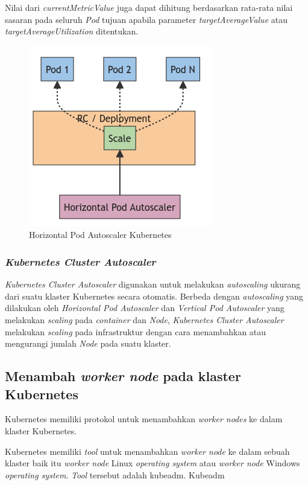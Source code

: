 Nilai dari \emph{currentMetricValue} juga dapat dihitung berdasarkan rata-rata nilai
sasaran pada seluruh \emph{Pod} tujuan apabila parameter \emph{targetAverageValue} atau
\emph{targetAverageUtilization} ditentukan.

\begin{figure} [H] \centering
  \includegraphics[scale=0.6]{gambar/horizontal_pod_autoscalling_figure.png}
  \caption{Horizontal Pod Autoscaler Kubernetes \parencite{kubernetes-website-hpa}}
  \label{fig:HorizontalPodAutoscalling}
\end{figure}

\subsubsection{\emph{Kubernetes Cluster Autoscaler}}

\emph{Kubernetes Cluster Autoscaler} digunakan untuk melakukan \emph{autoscaling}
ukurang dari suatu klaster Kubernetes secara otomatis. Berbeda dengan \emph{autoscaling}
yang dilakukan oleh \emph{Horizontal Pod Autoscaler} dan \emph{Vertical Pod Autoscaler} yang
melakukan \emph{scaling} pada \emph{container} dan \emph{Node}, \emph{Kubernetes Cluster Autoscaler}
melakukan \emph{scaling} pada infrastruktur dengan cara menambahkan atau mengurangi jumlah
\emph{Node} pada suatu klaster.

\subsection{Menambah \emph{worker node} pada klaster Kubernetes}

Kubernetes memiliki protokol untuk menambahkan \emph{worker nodes} ke dalam klaster Kubernetes.

Kubernetes memiliki \emph{tool} untuk menambahkan \emph{worker node} ke dalam sebuah klaster
baik itu \emph{worker node} Linux \emph{operating system} atau \emph{worker node} Windows \emph{operating system}.
\emph{Tool} tersebut adalah kubeadm. Kubeadm 

